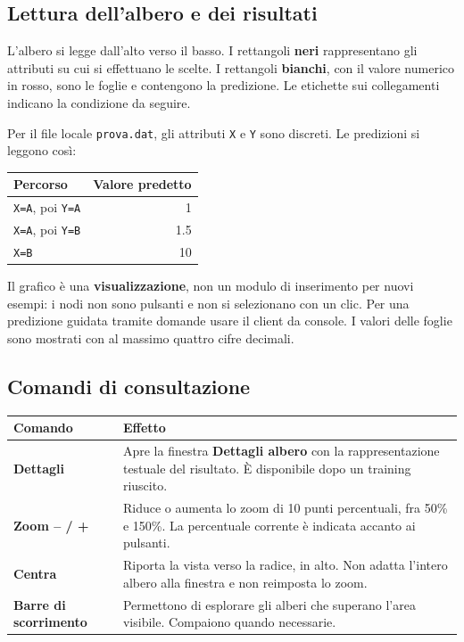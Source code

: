 \clearpage
\subsection*{Lettura dell'albero e dei risultati}

L'albero si legge dall'alto verso il basso. I rettangoli \textbf{neri}
rappresentano gli attributi su cui si effettuano le scelte. I rettangoli
\textbf{bianchi}, con il valore numerico in rosso, sono le foglie e contengono
la predizione. Le etichette sui collegamenti indicano la condizione da seguire.

Per il file locale \texttt{prova.dat}, gli attributi \texttt{X} e \texttt{Y}
sono discreti. Le predizioni si leggono così:

\begin{center}
\begin{tabularx}{\textwidth}{@{}Xr@{}}
\toprule
\textbf{Percorso} & \textbf{Valore predetto} \\
\midrule
\texttt{X=A}, poi \texttt{Y=A} & 1 \\
\texttt{X=A}, poi \texttt{Y=B} & 1.5 \\
\texttt{X=B} & 10 \\
\bottomrule
\end{tabularx}
\end{center}

Il grafico è una \textbf{visualizzazione}, non un modulo di inserimento per
nuovi esempi: i nodi non sono pulsanti e non si selezionano con un clic.
Per una predizione guidata tramite domande usare il client da console.
I valori delle foglie sono mostrati con al massimo quattro cifre decimali.

\subsection*{Comandi di consultazione}

\begin{center}
\begin{tabularx}{\textwidth}{@{}lX@{}}
\toprule
\textbf{Comando} & \textbf{Effetto} \\
\midrule
\textbf{Dettagli} & Apre la finestra \textbf{Dettagli albero} con la
rappresentazione testuale del risultato. È disponibile dopo un training riuscito. \\
\textbf{Zoom -- / +} & Riduce o aumenta lo zoom di 10 punti percentuali,
fra 50\% e 150\%. La percentuale corrente è indicata accanto ai pulsanti. \\
\textbf{Centra} & Riporta la vista verso la radice, in alto. Non adatta
l'intero albero alla finestra e non reimposta lo zoom. \\
\textbf{Barre di scorrimento} & Permettono di esplorare gli alberi che
superano l'area visibile. Compaiono quando necessarie. \\
\bottomrule
\end{tabularx}
\end{center}

